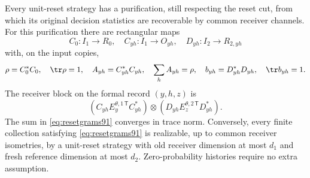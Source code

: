 \begin{lemma}\label{lem:resetnormal91}
Every unit-reset strategy has a purification, still respecting the reset
cut, from which its original decision statistics are recoverable by
common receiver channels.  For this purification there are rectangular
maps
\[
 C_0:I_1\longrightarrow R_0,\quad
 C_{yh}:I_1\longrightarrow O_{yh},\quad
 D_{yh}:I_2\longrightarrow R_{2,yh}
\]
with, on the input copies,
\begin{equation}\label{eq:resetgrams91}
 \rho=C_0^*C_0,\quad \tr\rho=1,\quad
 A_{yh}=C_{yh}^*C_{yh},\quad \sum_hA_{yh}=\rho,\quad
 b_{yh}=D_{yh}^*D_{yh},\quad\tr b_{yh}=1.
\end{equation}
The receiver block on the formal record $(y,h,z)$ is
\begin{equation}\label{eq:resetblock91}
 (C_{yh}E_y^{\theta,1\,\mathsf T}C_{yh}^*)
 \otimes(D_{yh}E_z^{\theta,2\,\mathsf T}D_{yh}^*).
\end{equation}
The sum in \eqref{eq:resetgrams91} converges in trace norm.
Conversely, every finite collection satisfying \eqref{eq:resetgrams91}
is realizable, up to common receiver isometries, by a unit-reset strategy
with old receiver dimension at most $d_1$ and fresh reference dimension
at most $d_2$.  Zero-probability histories require no extra assumption.
\end{lemma}
